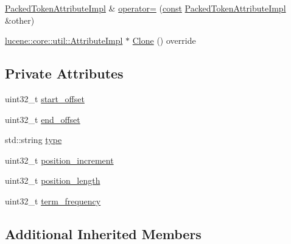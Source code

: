 \begin{DoxyCompactItemize}
\item 
\mbox{\hyperlink{classlucene_1_1core_1_1analysis_1_1tokenattributes_1_1PackedTokenAttributeImpl}{Packed\+Token\+Attribute\+Impl}} \& \mbox{\hyperlink{classlucene_1_1core_1_1analysis_1_1tokenattributes_1_1PackedTokenAttributeImpl_a87fbfcbb26c03dc5fd6d6d51fc41e817}{operator=}} (\mbox{\hyperlink{ZlibCrc32_8h_a2c212835823e3c54a8ab6d95c652660e}{const}} \mbox{\hyperlink{classlucene_1_1core_1_1analysis_1_1tokenattributes_1_1PackedTokenAttributeImpl}{Packed\+Token\+Attribute\+Impl}} \&other)
\item 
\mbox{\hyperlink{classlucene_1_1core_1_1util_1_1AttributeImpl}{lucene\+::core\+::util\+::\+Attribute\+Impl}} $\ast$ \mbox{\hyperlink{classlucene_1_1core_1_1analysis_1_1tokenattributes_1_1PackedTokenAttributeImpl_ab96495b9ba0271afe2597425f925ee91}{Clone}} () override
\end{DoxyCompactItemize}
\subsection*{Private Attributes}
\begin{DoxyCompactItemize}
\item 
uint32\+\_\+t \mbox{\hyperlink{classlucene_1_1core_1_1analysis_1_1tokenattributes_1_1PackedTokenAttributeImpl_a15d9f4ff5be2008f86e853cabff85566}{start\+\_\+offset}}
\item 
uint32\+\_\+t \mbox{\hyperlink{classlucene_1_1core_1_1analysis_1_1tokenattributes_1_1PackedTokenAttributeImpl_ae3b9bf799d0a6645eafbda1b01094e81}{end\+\_\+offset}}
\item 
std\+::string \mbox{\hyperlink{classlucene_1_1core_1_1analysis_1_1tokenattributes_1_1PackedTokenAttributeImpl_a39f37a016d846f19589fda8383489164}{type}}
\item 
uint32\+\_\+t \mbox{\hyperlink{classlucene_1_1core_1_1analysis_1_1tokenattributes_1_1PackedTokenAttributeImpl_ab999325a1f0d535a767f924fcd3954c5}{position\+\_\+increment}}
\item 
uint32\+\_\+t \mbox{\hyperlink{classlucene_1_1core_1_1analysis_1_1tokenattributes_1_1PackedTokenAttributeImpl_aaed2579a261b29b608ed68aa2b7728fd}{position\+\_\+length}}
\item 
uint32\+\_\+t \mbox{\hyperlink{classlucene_1_1core_1_1analysis_1_1tokenattributes_1_1PackedTokenAttributeImpl_a415328f42ee5fc7e0a39479b7e3a8f67}{term\+\_\+frequency}}
\end{DoxyCompactItemize}
\subsection*{Additional Inherited Members}


